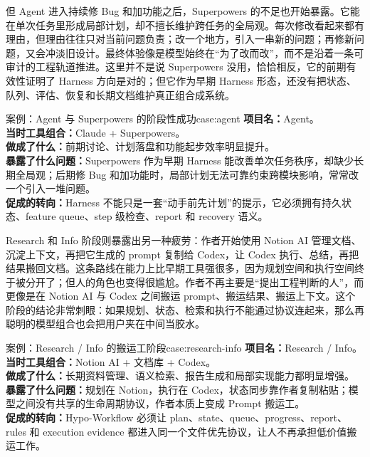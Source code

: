 \documentclass[
  outputdir=build,
  chapterstyle=cn,
  colorscheme=Simple,
  fontset=tech,
  code=false
]{Hypo-Note}
\begin{document}
但 Agent 进入持续修 Bug 和加功能之后，Superpowers 的不足也开始暴露。它能在单次任务里形成局部计划，却不擅长维护跨任务的全局观。每次修改看起来都有理由，但理由往往只对当前问题负责；改一个地方，引入一串新的问题；再修新问题，又会冲淡旧设计。最终体验像是模型始终在“为了改而改”，而不是沿着一条可审计的工程轨道推进。这里并不是说 Superpowers 没用，恰恰相反，它的前期有效性证明了 Harness 方向是对的；但它作为早期 Harness 形态，还没有把状态、队列、评估、恢复和长期文档维护真正组合成系统。

\begin{example}{案例：Agent 与 Superpowers 的阶段性成功}{case:agent}
\textbf{项目名：}Agent。\\
\textbf{当时工具组合：}Claude + Superpowers。\\
\textbf{做成了什么：}前期讨论、计划落盘和功能起步效率明显提升。\\
\textbf{暴露了什么问题：}Superpowers 作为早期 Harness 能改善单次任务秩序，却缺少长期全局观；后期修 Bug 和加功能时，局部计划无法可靠约束跨模块影响，常常改一个引入一堆问题。\\
\textbf{促成的转向：}Harness 不能只是一套“动手前先计划”的提示，它必须拥有持久状态、feature queue、step 级检查、report 和 recovery 语义。
\end{example}

Research 和 Info 阶段则暴露出另一种疲劳：作者开始使用 Notion AI 管理文档、沉淀上下文，再把它生成的 prompt 复制给 Codex，让 Codex 执行、总结，再把结果搬回文档。这条路线在能力上比早期工具强很多，因为规划空间和执行空间终于被分开了；但人的角色也变得很尴尬。作者不再主要是“提出工程判断的人”，而更像是在 Notion AI 与 Codex 之间搬运 prompt、搬运结果、搬运上下文。这个阶段的结论非常刺眼：如果规划、状态、检索和执行不能通过协议连起来，那么再聪明的模型组合也会把用户夹在中间当胶水。

\begin{example}{案例：Research / Info 的搬运工阶段}{case:research-info}
\textbf{项目名：}Research / Info。\\
\textbf{当时工具组合：}Notion AI + 文档库 + Codex。\\
\textbf{做成了什么：}长期资料管理、语义检索、报告生成和局部实现能力都明显增强。\\
\textbf{暴露了什么问题：}规划在 Notion，执行在 Codex，状态同步靠作者复制粘贴；模型之间没有共享的生命周期协议，作者本质上变成 Prompt 搬运工。\\
\textbf{促成的转向：}Hypo-Workflow 必须让 plan、state、queue、progress、report、rules 和 execution evidence 都进入同一个文件优先协议，让人不再承担低价值搬运工作。
\end{example}
\end{document}
